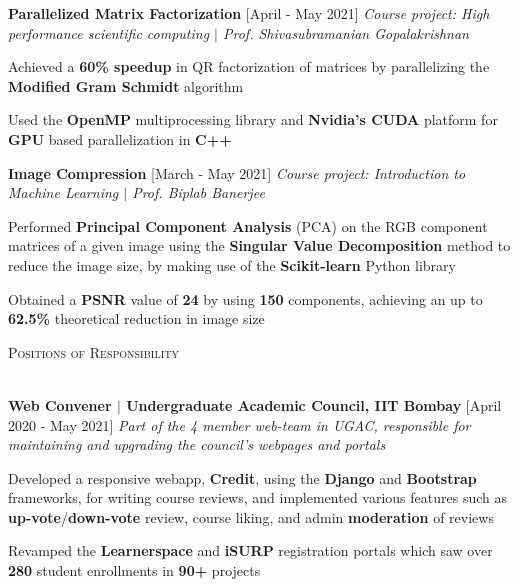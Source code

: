 \documentclass[10pt]{article}
\renewcommand{\section}[1]{
    \vspace*{3pt}
    \textsc{\Large{#1}}
    \vspace*{-8pt} \\ \hspace*{-5pt} 
    \hrulefill \\
    \vspace*{-15pt}
    \vspace*{-5pt}
}
\newcommand{\smallbullet}{
    \small$\bullet$
}
\newcommand{\bigblock}[3]{
    {
        \vspace*{2pt}
        \hspace*{-8pt} {\large{\textbf{#1}}} \hfill #2 \newline
        \textit{\textsf{#3}}
    }
}
\newenvironment{bullet-list-minor}{
    \begin{list}{
        \smallbullet
    }{
        \setlength\leftmargin{15pt}\topsep -5pt \itemsep -6pt
    }
} {
    \end{list}
}
\begin{document}
    \bigblock{
        Parallelized Matrix Factorization
    }{
        [April - May 2021]
    }{
        Course project: High performance scientific computing \(|\) Prof. Shivasubramanian Gopalakrishnan
    }
	\begin{bullet-list-minor}
        \item Achieved a \textbf{60\% speedup} in QR factorization of matrices by parallelizing the \textbf{Modified Gram Schmidt} algorithm
        \item Used the \textbf{OpenMP} multiprocessing library and \textbf{Nvidia's CUDA} platform for \textbf{GPU} based parallelization in \textbf{C++}
    \end{bullet-list-minor}

    \bigblock{
        Image Compression
    }{
        [March - May 2021]
    }{
        Course project: Introduction to Machine Learning \(|\) Prof. Biplab Banerjee
    }
	\begin{bullet-list-minor}
        \item Performed \textbf{Principal Component Analysis} (PCA) on the RGB component matrices of a given image using the \textbf{Singular Value Decomposition} method to reduce the image size, by making use of the \textbf{Scikit-learn} Python library
        \item Obtained a \textbf{PSNR} value of \textbf{24} by using \textbf{150} components, achieving an up to \textbf{62.5\%} theoretical reduction in image size
    \end{bullet-list-minor}


    \section{Positions of Responsibility}

    \bigblock{
        Web Convener \(|\) Undergraduate Academic Council, IIT Bombay
    }{
        [April 2020 - May 2021]
    }{
        Part of the 4 member web-team in UGAC, responsible for maintaining and upgrading the council's webpages and portals
    }
    \begin{bullet-list-minor}
        \item Developed a responsive webapp, \textbf{Credit}, using the \textbf{Django} and \textbf{Bootstrap} frameworks, for writing course reviews, and implemented various features such as \textbf{up-vote}/\textbf{down-vote} review, course liking, and admin \textbf{moderation} of reviews
        \item Revamped the \textbf{Learnerspace} and \textbf{iSURP} registration portals which saw over \textbf{280} student enrollments in \textbf{90+} projects
    \end{bullet-list-minor}
\end{document}
